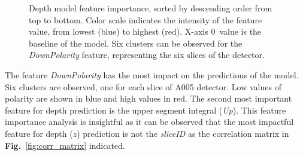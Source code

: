 \begin{figure}
\centering
{}
\caption{Depth model feature importance, sorted by descending order from top to bottom. Color scale indicates the intensity of the feature value, from lowest (blue) to highest (red). X-axis 0~value is the baseline of the model. Six clusters can be observed for the \textit{DownPolarity} feature, representing the six slices of the detector.} 
\label{fig:detph_treeSHAP}       %
\end{figure}

The feature \textit{DownPolarity} has the most impact on the predictions of the model. Six clusters are observed, one for each slice of A005 detector. Low values of polarity are shown in blue and high values in red. The second most important feature for depth prediction is the upper segment integral (\textit{Up}). This feature importance analysis is insightful as it can be observed that the most impactful feature for depth ($z$) prediction is not the \textit{sliceID} as the correlation matrix in \textbf{Fig.}~\ref{fig:corr_matrix} indicated.



